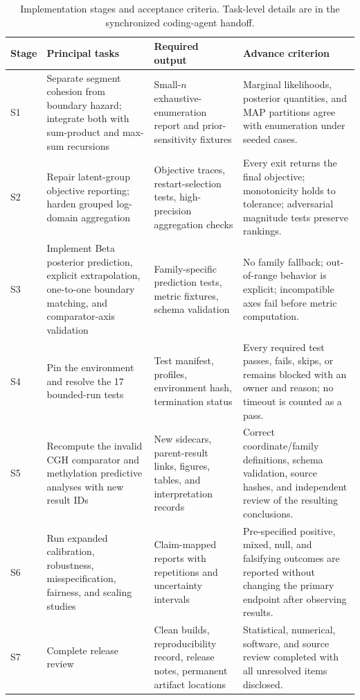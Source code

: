 \begin{table}[H]
\centering
\small
\begin{tabularx}{0.97\textwidth}{@{}p{}p{}p{}X@{}}
\toprule
\textbf{Stage} & \textbf{Principal tasks} & \textbf{Required output} & \textbf{Advance criterion} \\
\midrule
S1 & Separate segment cohesion from boundary hazard; integrate both with sum-product and max-sum recursions & Small-$n$ exhaustive-enumeration report and prior-sensitivity fixtures & Marginal likelihoods, posterior quantities, and MAP partitions agree with enumeration under seeded cases. \\
S2 & Repair latent-group objective reporting; harden grouped log-domain aggregation & Objective traces, restart-selection tests, high-precision aggregation checks & Every exit returns the final objective; monotonicity holds to tolerance; adversarial magnitude tests preserve rankings. \\
S3 & Implement Beta posterior prediction, explicit extrapolation, one-to-one boundary matching, and comparator-axis validation & Family-specific prediction tests, metric fixtures, schema validation & No family fallback; out-of-range behavior is explicit; incompatible axes fail before metric computation. \\
S4 & Pin the environment and resolve the 17 bounded-run tests & Test manifest, profiles, environment hash, termination status & Every required test passes, fails, skips, or remains blocked with an owner and reason; no timeout is counted as a pass. \\
S5 & Recompute the invalid CGH comparator and methylation predictive analyses with new result IDs & New sidecars, parent-result links, figures, tables, and interpretation records & Correct coordinate/family definitions, schema validation, source hashes, and independent review of the resulting conclusions. \\
S6 & Run expanded calibration, robustness, misspecification, fairness, and scaling studies & Claim-mapped reports with repetitions and uncertainty intervals & Pre-specified positive, mixed, null, and falsifying outcomes are reported without changing the primary endpoint after observing results. \\
S7 & Complete release review & Clean builds, reproducibility record, release notes, permanent artifact locations & Statistical, numerical, software, and source review completed with all unresolved items disclosed. \\
\bottomrule
\end{tabularx}
\caption{Implementation stages and acceptance criteria. Task-level details are in the synchronized coding-agent handoff.}
\label{tab:exec-stages}
\end{table}

